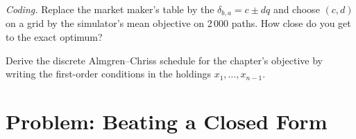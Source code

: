 \begin{exercise}[$\star\star\star$]\label{exo:ml:reinforcement-learning-for-execution-and-market-making:7}
\emph{Coding.} Replace the market maker's table by the  $\delta_{b,a} = c\pm dq$ and choose $(c, d)$ on a grid by the
simulator's mean objective on 2\,000 paths. How close do you get to the exact optimum?
\end{exercise}

\begin{exercise}[$\star\star\star$]\label{exo:ml:reinforcement-learning-for-execution-and-market-making:8}
Derive the discrete Almgren--Chriss schedule for the chapter's objective by writing the first-order conditions in the
holdings $x_1,\dots,x_{n-1}$.
\end{exercise}

\section{Problem: Beating a Closed Form}

